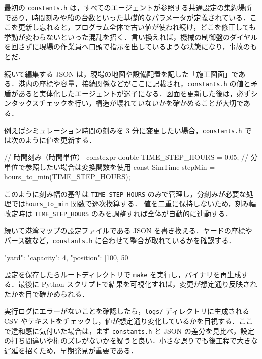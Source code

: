 \documentclass[10pt,letterpaper]{jsarticle}
\begin{document}
最初の \verb|constants.h| は，すべてのエージェントが参照する共通設定の集約場所であり，時間刻みや船の台数といった基礎的なパラメータが定義されている．ここを更新し忘れると，プログラム全体で古い値が使われ続け，どこを修正しても挙動が変わらないといった混乱を招く．言い換えれば，機械の制御盤のダイヤルを回さずに現場の作業員へ口頭で指示を出しているような状態になり，事故のもとだ．

続いて編集する JSON は，現場の地図や設備配置を記した「施工図面」である．港内の座標や容量，接続関係などがここに記載され，\verb|constants.h| の値と矛盾があると実体化したエージェントが迷子になる．図面を更新した後は，必ずシンタックスチェックを行い，構造が壊れていないかを確かめることが大切である．

例えばシミュレーション時間の刻みを 3 分に変更したい場合，\verb|constants.h| では次のように値を更新する．

\begin{cppcode}[caption=constants.h の変更例]
// 時間刻み（時間単位）
constexpr double TIME_STEP_HOURS = 0.05;
// 分単位で参照したい場合は変換関数を使用
const SimTime stepMin = hours_to_min(TIME_STEP_HOURS);

\end{cppcode}
このように刻み幅の基準は \texttt{TIME\_STEP\_HOURS} のみで管理し，分刻みが必要な処理では\texttt{hours\_to\_min} 関数で逐次換算する．
値を二重に保持しないため，刻み幅改定時は \texttt{TIME\_STEP\_HOURS} のみを調整すれば全体が自動的に連動する．

続いて港湾マップの設定ファイルである JSON を書き換える．ヤードの座標やバース数など，\verb|constants.h| に合わせて整合が取れているかを確認する．

\begin{jsoncode}[caption=港湾マップ JSON の一部]
{
  "yard": {
    "capacity": 4,
    "position": [100, 50]
  }
}
\end{jsoncode}

設定を保存したらルートディレクトリで \verb|make| を実行し，バイナリを再生成する．最後に Python スクリプトで結果を可視化すれば，変更が想定通り反映されたかを目で確かめられる．


実行ログにエラーがないことを確認したら，\verb|logs/| ディレクトリに生成される CSV やテキストをチェックし，値が想定通り変化しているかを目視する．ここで違和感に気付いた場合は，まず \verb|constants.h| と JSON の差分を見比べ，設定の打ち間違いや桁のズレがないかを疑うと良い．小さな誤りでも後工程で大きな遅延を招くため，早期発見が重要である．
\end{document}
